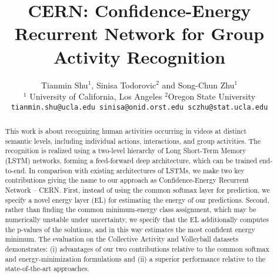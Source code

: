 \documentclass[10pt,twocolumn,letterpaper]{article}
\begin{document}
\title{CERN: Confidence-Energy Recurrent Network for Group Activity Recognition}

\author{Tianmin Shu$^1$, Sinisa Todorovic$^2$ and Song-Chun Zhu$^1$\\
$^1$ University of California, Los Angeles $^2$Oregon State University\\
{\tt\small tianmin.shu@ucla.edu sinisa@onid.orst.edu sczhu@stat.ucla.edu}
}


\def \rb{\bm{r}} %
\def \sb{\bm{s}} %
\def \cb{\bm{c}} %
\def \hb{\bm{h}} %
\def \wb{\bm{w}} %
\def \bb{\bm{b}} %
\def \nb{\bm{n}} %

\def \xb{{\bf{x}}}
\def \ob{{\bf{w}}}
\def \pb{{\bf{p}}}
\def \lb{{\boldsymbol{\lambda}}}
\def \psib{{\boldsymbol{\psi}}}

\newtheorem{prop}{Proposition}

\DeclarePairedDelimiter{\ceil}{\lceil}{\rceil}

\maketitle

\begin{abstract}
This work is about recognizing human activities occurring in videos at distinct semantic levels, including individual actions, interactions, and group activities. The recognition is realized using a two-level hierarchy of Long Short-Term Memory (LSTM) networks, forming a feed-forward deep architecture, which can be trained end-to-end. In comparison with existing architectures of LSTMs, we make two key contributions giving the name to our approach as Confidence-Energy Recurrent Network -- CERN. First, instead of using the common softmax layer for prediction, we specify a novel energy layer (EL) for estimating the energy of our predictions. Second, rather than finding the common minimum-energy class assignment, which may be numerically unstable under uncertainty, we specify that the EL additionally computes the p-values of the solutions, and in this way estimates the most confident energy minimum. The evaluation on the Collective Activity and Volleyball datasets demonstrates: (i) advantages of our two contributions relative to the common softmax and energy-minimization formulations and (ii) a superior performance relative to the state-of-the-art approaches. 
\end{abstract}
\end{document}
